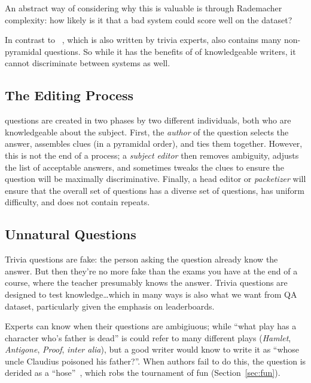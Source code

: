 An abstract way of considering why this is valuable is through Rademacher complexity: how likely is it that a bad system could score well on the dataset?

In contrast to \triviaqa{}~\cite{joshi-17}, which is also written by trivia experts, also contains many non-pyramidal questions.
So while it has the benefits of of knowledgeable writers, it cannot discriminate between systems as well.

\subsection{The Editing Process}

\qb{} questions are created in two phases by two different individuals, both who are knowledgeable about the subject.
First, the \emph{author} of the question selects the answer, assembles clues (in a pyramidal order), and ties them together.
However, this is not the end of a process; a \emph{subject editor} then removes ambiguity, adjusts the list of acceptable answers, and sometimes tweaks the clues to ensure the question will be maximally discriminative.
Finally, a head editor or \emph{packetizer} will ensure that the overall set of questions has a diverse set of questions, has uniform difficulty, and does not contain repeats.

\subsection{Unnatural Questions}
\label{sec:unnatural}

Trivia questions are fake: the person asking the question already know the answer.  
But then they're no more fake than the exams you have at the end of a course, where the teacher presumably knows the answer. 
Trivia questions are designed to test knowledge\dots which in many ways is also what we want from QA dataset, particularly given the emphasis on leaderboards.  

Experts can know when their questions are ambigiuous; while ``what play has a character who's father is dead'' is could refer to many different plays (\textit{Hamlet}, \textit{Antigone}, \textit{Proof}, \textit{inter alia}), but a good writer would know to write it as ``whose uncle Claudius poisoned his father?''.
When authors fail to do this, the question is derided as a ``hose''~\cite{2013-eltinge}, which robs the tournament of fun (Section~\ref{sec:fun}).

